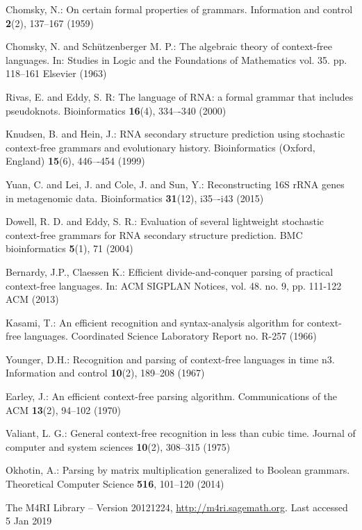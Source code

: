 \documentclass[runningheads]{llncs}
\begin{document}
%
%
%
% 
% 
%
\begin{thebibliography}{8}
Chomsky, N.: On certain formal properties of grammars. Information and control \textbf{2}(2), 137--167 (1959)

Chomsky, N. and Schützenberger M. P.: The algebraic theory of context-free languages. In: Studies in Logic and the Foundations of Mathematics vol. 35. pp. 118--161 Elsevier (1963)

Rivas, E. and Eddy, S. R: The language of RNA: a formal grammar that includes pseudoknots. Bioinformatics \textbf{16}(4), 334–-340 (2000)

Knudsen, B. and Hein, J.: RNA secondary structure prediction using stochastic context-free grammars and evolutionary history. Bioinformatics (Oxford, England) \textbf{15}(6), 446–-454 (1999)

Yuan, C. and Lei, J. and Cole, J. and Sun, Y.: Reconstructing 16S rRNA genes in metagenomic data. Bioinformatics \textbf{31}(12), i35–-i43 (2015)

Dowell, R. D. and Eddy, S. R.: Evaluation of several lightweight stochastic context-free grammars for RNA secondary structure prediction. BMC bioinformatics \textbf{5}(1), 71 (2004)

Bernardy, J.P., Claessen K.: Efficient divide-and-conquer parsing of practical context-free languages. In: ACM SIGPLAN Notices, vol. 48. no. 9, pp. 111-122 ACM (2013)

Kasami, T.: An efficient recognition and syntax-analysis algorithm for context-free languages. Coordinated Science Laboratory Report no. R-257 (1966)

Younger, D.H.: Recognition and parsing of context-free languages in time n3. Information and control \textbf{10}(2), 189--208 (1967)

Earley, J.: An efficient context-free parsing algorithm. Communications of the ACM \textbf{13}(2), 94--102 (1970)

Valiant, L. G.: General context-free recognition in less than cubic time. Journal of computer and system sciences \textbf{10}(2), 308--315 (1975)

Okhotin, A.: Parsing by matrix multiplication generalized to Boolean grammars. Theoretical Computer Science \textbf{516}, 101--120 (2014)

The M4RI Library -- Version 20121224, \url{http://m4ri.sagemath.org}. Last accessed 5
Jan 2019


\end{thebibliography}
\end{document}
